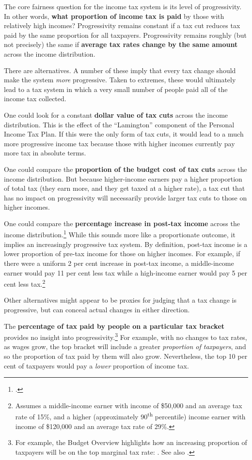 \documentclass[submission]{grattan}\usepackage[]{graphicx}\usepackage[]{color}
\begin{document}
The core fairness question for the income tax system is its level of progressivity. In other words, \textbf{what proportion of income tax is paid} by those with relatively high incomes? Progressivity remains constant if a tax cut reduces tax paid by the same proportion for all taxpayers. Progressivity remains roughly (but not precisely) the same if \textbf{average tax rates change by the same amount} across the income distribution.

There are alternatives. A number of these imply that every tax change should make the system \emph{more} progressive. Taken to extremes, these would ultimately lead to a tax system in which a very small number of people paid all of the income tax collected.

One could look for a constant \textbf{dollar value of tax cuts} across the income distribution. This is the effect of the ``Lamington'' component of the Personal Income Tax Plan. If this were the only form of tax cuts, it would lead to a much more progressive income tax because those with higher incomes currently pay more tax in absolute terms.

One could compare the \textbf{proportion of the budget cost of tax cuts} across the income distribution.
But because higher-income earners pay a higher proportion of total tax (they earn more, and they get taxed at a higher rate), a tax cut that has no impact on progressivity will necessarily provide larger tax cuts to those on higher incomes.

One could compare the \textbf{percentage increase in post-tax income} across the income distribution.\footcite[][11]{Phillips2018}
While this sounds more like a proportionate outcome, it implies an increasingly progressive tax system. By definition, post-tax income is a lower proportion of pre-tax income for those on higher incomes. For example, if there were a uniform 2 per cent increase in post-tax income, a middle-income earner would pay 11 per cent less tax while a high-income earner would pay 5 per cent less tax.\footnote{Assumes a middle-income earner with income of \$50,000 and an average tax rate of 15\%, and a higher (approximately 90\textsuperscript{th} percentile) income earner with income of \$120,000 and an average tax rate of 29\%.}

Other alternatives might appear to be proxies for judging that a tax change is progressive, but can conceal actual changes in either direction.

The \textbf{percentage of tax paid by people on a particular tax bracket} provides no insight into progressivity.\footnote{For example, the Budget Overview highlights how an increasing proportion of taxpayers will be on the top marginal tax rate: \textcite[][9]{Treasury2018b}. See also \textcite[][7--8]{Treasury2018c}.}
For example, with no changes to tax rates, as wages grow, the top bracket will include a greater \emph{proportion of taxpayers}, and so the proportion of tax paid by them will also grow. Nevertheless, the top 10 per cent of taxpayers would pay a \emph{lower} proportion of income tax.
\end{document}
